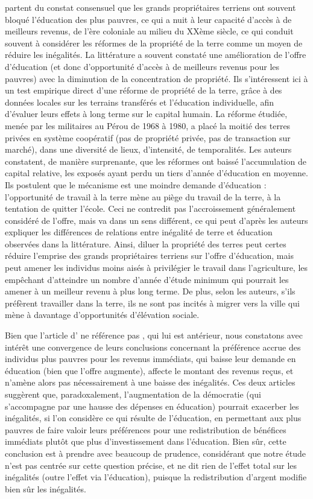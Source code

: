 \documentclass[pagesize, twoside=off, bibliography=totoc, DIV=calc, fontsize=12pt, a4paper, french]{scrartcl}
\begin{document}
 partent du constat consensuel que les grands propriétaires terriens ont souvent bloqué l’éducation des plus pauvres, ce qui a nuit à leur capacité d’accès à de meilleurs revenus, de l’ère coloniale au milieu du XXème siècle, ce qui conduit souvent à considérer les réformes de la propriété de la terre comme un moyen de réduire les inégalités. La littérature a souvent constaté une amélioration de l’offre d’éducation (et donc d’opportunité d’accès à de meilleurs revenus pour les pauvres) avec la diminution de la concentration de propriété. Ils s’intéressent ici à un test empirique direct d’une réforme de propriété de la terre, grâce à des données locales sur les terrains transférés et l’éducation individuelle, afin d’évaluer leurs effets à long terme sur le capital humain. La réforme étudiée, menée par les militaires au Pérou de 1968 à 1980, a placé la moitié des terres privées en système coopératif (pas de propriété privée, pas de transaction sur marché), dans une diversité de lieux, d’intensité, de temporalités. Les auteurs constatent, de manière surprenante, que les réformes ont baissé l’accumulation de capital relative, les exposés ayant perdu un tiers d’année d’éducation en moyenne. Ils postulent que le mécanisme est une moindre demande d’éducation : l’opportunité de travail à la terre mène au piège du travail de la terre, à la tentation de quitter l’école. Ceci ne contredit pas l’accroissement généralement considéré de l’offre, mais va dans un sens différent, ce qui peut d’après les auteurs expliquer les différences de relations entre inégalité de terre et éducation observées dans la littérature. Ainsi, diluer la propriété des terres peut certes réduire l’emprise des grands propriétaires terriens sur l’offre d’éducation, mais peut amener les individus moins aisés à privilégier le travail dans l’agriculture, les empêchant d’atteindre un nombre d’année d’étude minimum qui pourrait les amener à un meilleur revenu à plus long terme. De plus, selon les auteurs, s’ils préfèrent travailler dans la terre, ils ne sont pas incités à migrer vers la ville qui mène à davantage d’opportunités d’élévation sociale.

Bien que l’article d’\citet{albertus_land_2020} ne référence pas \citet{bursztyn_poverty_2016}, qui lui est antérieur, nous constatons avec intérêt une convergence de leurs conclusions concernant la préférence accrue des individus plus pauvres pour les revenus immédiats, qui baisse leur demande en éducation (bien que l’offre augmente), affecte le montant des revenus reçus, et n’amène alors pas nécessairement à une baisse des inégalités. Ces deux articles suggèrent que, paradoxalement, l’augmentation de la démocratie (qui s’accompagne par une hausse des dépenses en éducation) pourrait exacerber les inégalités, si l’on considère ce qui résulte de l’éducation, en permettant aux plus pauvres de faire valoir leurs préférences pour une redistribution de bénéfices immédiats plutôt que plus d’investissement dans l’éducation. Bien sûr, cette conclusion est à prendre avec beaucoup de prudence, considérant que notre étude n’est pas centrée sur cette question précise, et ne dit rien de l’effet total sur les inégalités (outre l’effet via l’éducation), puisque la redistribution d’argent modifie bien sûr les inégalités.
\end{document}
